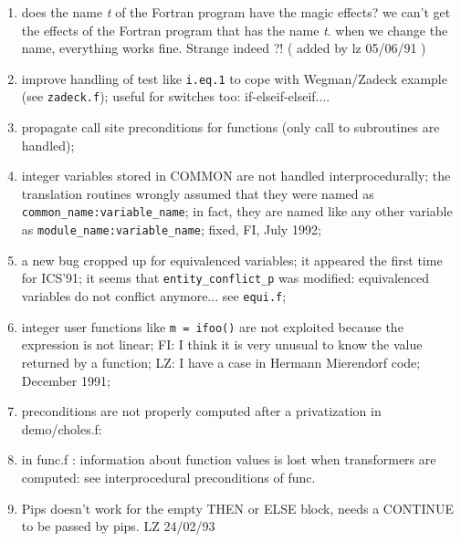 \begin{enumerate}
  \item does the name {\em t} of the Fortran program have the magic
        effects? we can't get the effects of the Fortran program that
        has the name {\em t}. when we change the name, everything works
        fine. Strange indeed ?! ( added by lz 05/06/91 )

  \item improve handling of test like \verb+i.eq.1+ to cope with Wegman/Zadeck
	example (see \verb+zadeck.f+); 
	useful for switches too: if-elseif-elseif....

  \item propagate call site preconditions for functions (only call to
	subroutines are handled);

  \item integer variables stored in COMMON are not handled interprocedurally;
	the translation routines wrongly assumed that they were named as
	\verb+common_name:variable_name+; in fact, they are named like
	any other variable as \verb+module_name:variable_name+; fixed,
	FI, July 1992;

  \item a new bug cropped up for equivalenced variables; it appeared
	the first time for ICS'91; it seems that \verb+entity_conflict_p+
	was modified: equivalenced variables do not conflict anymore...
	see \verb+equi.f+;

  \item integer user functions like {\tt m = ifoo()} are not exploited because 
	the expression is not linear; FI: I think it is very unusual to
	know the value returned by a function; LZ: I have a case in
	Hermann Mierendorf code; December 1991;

  \item preconditions are not properly computed after a privatization
	in demo/choles.f:

  \item in func.f : information about function values is lost when
	transformers are computed: see interprocedural preconditions of func.

  \item Pips doesn't work for the empty THEN or ELSE block, needs a
	CONTINUE to be passed by pips. LZ 24/02/93


\end{enumerate}
